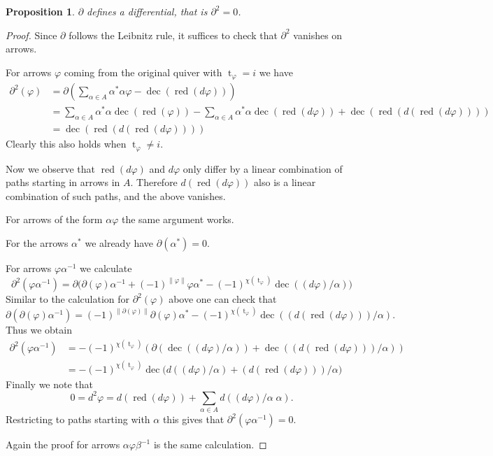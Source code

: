 \documentclass[a4paper,11pt]{amsart}
\newtheorem{proposition}[theorem]{Proposition}
\theoremstyle{definition}
\DeclareMathOperator{\red}{red}
\DeclareMathOperator{\dec}{dec}
\newcommand{\ci}[1]{\chi(#1)}
\newcommand{\ta}[1]{\operatorname{t}_{#1}}
\numberwithin{theorem}{section}
\begin{document}
\begin{proposition}
$\partial$ defines a differential, that is $\partial^2 = 0$.
\end{proposition}

\begin{proof}
Since $\partial$ follows the Leibnitz rule, it suffices to check that $\partial^2$ vanishes on arrows.

For arrows $\varphi$ coming from the original quiver with $\ta{\varphi} = i$ we have
\begin{align*}
\partial^2(\varphi) & = \partial(\sum_{\alpha \in A} \alpha^* \alpha \varphi - \dec( \red( d \varphi))) \\
& = \sum_{\alpha \in A} \alpha^* \alpha \dec(\red(\varphi)) - \sum_{\alpha \in A} \alpha^* \alpha \dec(\red(d \varphi)) + \dec( \red( d (\red( d \varphi)))) \\
& = \dec( \red( d (\red( d \varphi))))
\end{align*}
Clearly this also holds when $\ta{\varphi} \neq i$.

Now we observe that $\red( d \varphi)$ and $d \varphi$ only differ by a linear combination of paths starting in arrows in $A$. Therefore $d( \red( d \varphi))$ also is a linear combination of such paths, and the above vanishes.

For arrows of the form $\alpha \varphi$ the same argument works.

For the arrows $\alpha^*$ we already have $\partial(\alpha^*) = 0$.

For arrows $\varphi \alpha^{-1}$ we calculate
\[ \partial^2(\varphi \alpha^{-1}) = \partial\Big( \partial(\varphi) \alpha^{-1} + (-1)^{\| \varphi \|} \varphi \alpha^* - (-1)^{\ci{ \ta{\varphi}}} \dec( (d \varphi) / \alpha) \Big) \]
Similar to the calculation for $\partial^2(\varphi)$ above one can check that
\[ \partial ( \partial( \varphi) \alpha^{-1} ) = (-1)^{\| \partial(\varphi) \|}  \partial( \varphi ) \alpha^* - (-1)^{\ci{ \ta{\varphi}}} \dec(( d( \red (d \varphi) )) / \alpha ). \]
Thus we obtain
\begin{align*}
\partial^2(\varphi \alpha^{-1}) & = - (-1)^{\ci{ \ta{\varphi}}} ( \partial( \dec( (d \varphi) / \alpha)) + \dec(( d( \red (d \varphi) )) / \alpha ) ) \\
& = - (-1)^{\ci{ \ta{\varphi}}} \dec\Big( d( (d \varphi) / \alpha) + (d( \red ( d \varphi))) / \alpha \Big)
\end{align*}
Finally we note that
\[ 0 = d^2 \varphi = d(\red( d \varphi)) + \sum_{\alpha \in A} d( (d \varphi) / \alpha \; \alpha ). \]
Restricting to paths starting with $\alpha$ this gives that $\partial^2( \varphi \alpha^{-1}) = 0$.

Again the proof for arrows $\alpha \varphi \beta^{-1}$ is the same calculation.
\end{proof}
\end{document}
